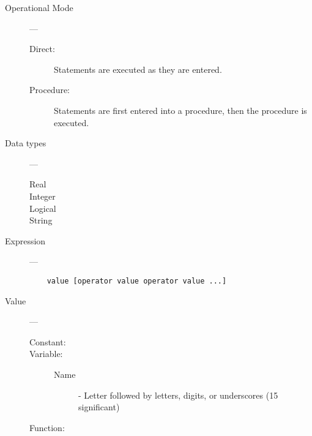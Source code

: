 \begin{description}

\item [Operational Mode] ---

\begin{description}
\item [Direct:] \mbox{}

Statements are executed as they are entered.

\item [Procedure:] \mbox{}

Statements are first entered into a procedure, then the procedure is
executed.
\end{description}

\item [Data types] ---

\begin{description}
\item[Real]
\item[Integer]
\item[Logical]
\item[String]
\end{description}

\item [Expression] ---

\begin{verbatim}
    value [operator value operator value ...]
\end{verbatim}

\item [Value] ---

\begin{description}
\item [Constant:] \mbox{}
\item [Variable:] \mbox{}
\begin{description}
\item[Name] - Letter followed by letters, digits, or underscores (15 significant)
\end{description}
\item [Function:] \mbox{}


\end{description}
\end{description}
